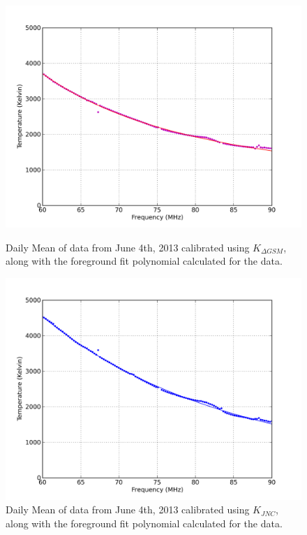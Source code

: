 \begin{figure}[htb]
\centering
\begin{minipage}[b]{0.48\textwidth}
\centering
\includegraphics[width=0.95\linewidth]{Data_analysis/figures/June_04_Kdgsm_mean_fit.png}
\caption{Daily Mean of data from June 4th, 2013 calibrated using $K_{\Delta GSM}$, along with the foreground fit polynomial calculated for the data. }
\label{Fig:Kdgsm_mean}
\end{minipage}%
\begin{minipage}[b]{0.02\textwidth}
\hspace{1cm}
\end{minipage}%
\begin{minipage}[b]{0.48\textwidth}
\centering
\includegraphics[width=0.95\linewidth]{Data_analysis/figures/June_04_Kt_mean_fit.png}
\caption{Daily Mean of data from June 4th, 2013 calibrated using $K_{JNC}$, along with the foreground fit polynomial calculated for the data. }
\label{Fig:Kjnc_mean}
\end{minipage}
\end{figure}

